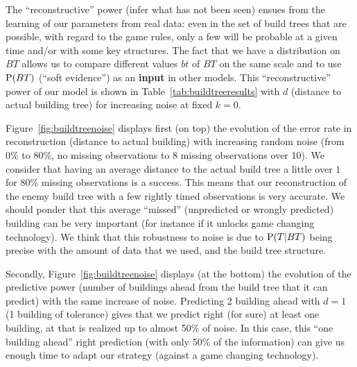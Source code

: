 The ``reconstructive'' power (infer what has not been seen) ensues from the learning of our parameters from real data: even in the set of build trees that are possible, with regard to the game rules, only a few will be probable at a given time and/or with some key structures. %
The fact that we have a distribution on $BT$ allows us to compare different values $bt$ of $BT$ on the same scale and to use $\mathrm{P}(BT)$ (``soft evidence'') as an \textbf{input} in other models. 
This ``reconstructive'' power of our model is shown in Table~\ref{tab:buildtreeresults} with $d$ (distance to actual building tree) for increasing noise at fixed $k=0$. 

Figure~\ref{fig:buildtreenoise} displays first (on top) the evolution of the error rate in reconstruction (distance to actual building) with increasing random noise (from 0\% to 80\%, no missing observations to 8 missing observations over 10). We consider that having an average distance to the actual build tree a little over $1$ for 80\% missing observations is a success. This means that our reconstruction of the enemy build tree with a few rightly timed observations is very accurate. We should ponder that this average ``missed'' (unpredicted or wrongly predicted) building can be very important (for instance if it unlocks game changing technology). We think that this robustness to noise is due to $\mathrm{P}(T|BT)$ being precise with the amount of data that we used, and the build tree structure. 

Secondly, Figure~\ref{fig:buildtreenoise} displays (at the bottom) the evolution of the predictive power (number of buildings ahead from the build tree that it can predict) with the same increase of noise. Predicting 2 building ahead with $d=1$ (1 building of tolerance) gives that we predict right (for sure) at least one building, at that is realized up to almost 50\% of noise. In this case, this ``one building ahead'' right prediction (with only 50\% of the information) can give us enough time to adapt our strategy (against a game changing technology).

